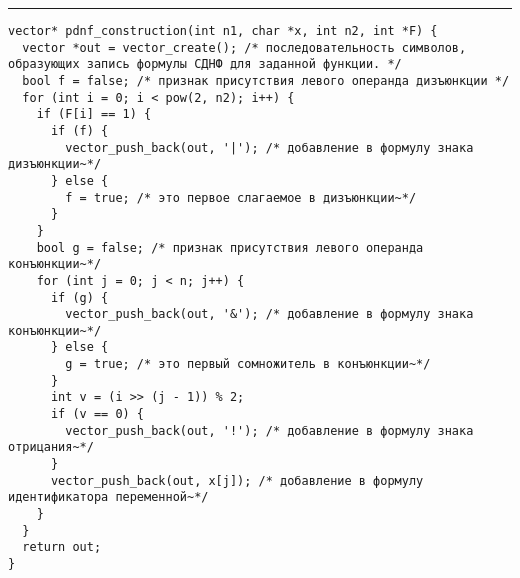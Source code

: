 \documentclass{article}
\begin{document}
\lstset{language = C,
    extendedchars = \true,
    keepspaces = true,
    breaklines=true,
    frame=lines}
\hrule
\begin{lstlisting}[title=\textbf {Алгоритм 3.3} Построение СДНФ]
vector* pdnf_construction(int n1, char *x, int n2, int *F) {
  vector *out = vector_create(); /* последовательность символов, образующих запись формулы СДНФ для заданной функции. */
  bool f = false; /* признак присутствия левого операнда дизъюнкции */
  for (int i = 0; i < pow(2, n2); i++) {
    if (F[i] == 1) {
      if (f) {
        vector_push_back(out, '|'); /* добавление в формулу знака дизъюнкции~*/
      } else {
        f = true; /* это первое слагаемое в дизъюнкции~*/
      }
    }
    bool g = false; /* признак присутствия левого операнда конъюнкции~*/
    for (int j = 0; j < n; j++) {
      if (g) {
        vector_push_back(out, '&'); /* добавление в формулу знака конъюнкции~*/
      } else {
        g = true; /* это первый сомножитель в конъюнкции~*/
      }
      int v = (i >> (j - 1)) % 2;
      if (v == 0) {
        vector_push_back(out, '!'); /* добавление в формулу знака отрицания~*/
      }
      vector_push_back(out, x[j]); /* добавление в формулу идентификатора переменной~*/
    }
  }
  return out;
}
\end{lstlisting}
\end{document}
